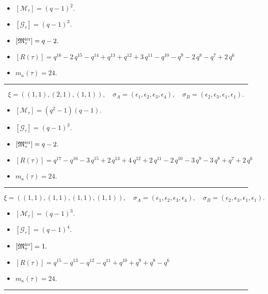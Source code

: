 \documentclass[10pt,a4paper]{amsart}
\begin{document}
\begin{itemize}
 \item $[\mathcal{M}_{\tau}] = {\left(q - 1\right)}^{2} .$

 \item $[\mathcal{G}_{\tau}] = {\left(q - 1\right)}^{3} .$

 \item $[{\frak M}_{\tau}^{\textrm{irr}}] = q - 2 .$

 \item $[R(\tau)] = q^{16} - 2 \, q^{15} - q^{14} + q^{13} + q^{12} + 3 \, q^{11} - q^{10} - q^{9} - 2 \, q^{8} - q^{7} + 2 \, q^{6} $

 \item $m_{\kappa}(\tau) = 24 .$

 \end{itemize}
\noindent\rule{8cm}{0.4pt}

$$\xi = ({(1, 1)}, {(2, 1), (1, 1)}),\quad \sigma_A = ({{\epsilon_1}}, {{\epsilon_2, \epsilon_3}, {\epsilon_4}}),\quad \sigma_B = ({{\epsilon_2}}, {{\epsilon_3, \epsilon_1}, {\epsilon_1}}).$$

\begin{itemize}
 \item $[\mathcal{M}_{\tau}] = {\left(q^{2} - 1\right)} {\left(q - 1\right)} .$

 \item $[\mathcal{G}_{\tau}] = {\left(q - 1\right)}^{3} .$

 \item $[{\frak M}_{\tau}^{\textrm{irr}}] = q - 2 .$

 \item $[R(\tau)] = q^{17} - q^{16} - 3 \, q^{15} + 2 \, q^{13} + 4 \, q^{12} + 2 \, q^{11} - 2 \, q^{10} - 3 \, q^{9} - 3 \, q^{8} + q^{7} + 2 \, q^{6} $

 \item $m_{\kappa}(\tau) = 24 .$

 \end{itemize}
\noindent\rule{8cm}{0.4pt}

$$\xi = ({(1, 1)}, {(1, 1), (1, 1), (1, 1)}),\quad \sigma_A = ({{\epsilon_1}}, {{\epsilon_2}, {\epsilon_3}, {\epsilon_4}}),\quad \sigma_B = ({{\epsilon_2}}, {{\epsilon_3}, {\epsilon_1}, {\epsilon_1}}).$$

\begin{itemize}
 \item $[\mathcal{M}_{\tau}] = {\left(q - 1\right)}^{3} .$

 \item $[\mathcal{G}_{\tau}] = {\left(q - 1\right)}^{4} .$

 \item $[{\frak M}_{\tau}^{\textrm{irr}}] = 1 .$

 \item $[R(\tau)] = q^{15} - q^{13} - q^{12} - q^{11} + q^{10} + q^{9} + q^{8} - q^{6} $

 \item $m_{\kappa}(\tau) = 24 .$

 \end{itemize}
\noindent\rule{8cm}{0.4pt}
\end{document}
